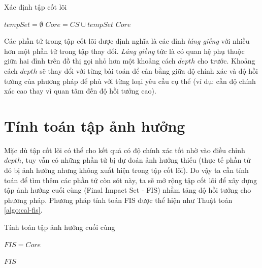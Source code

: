 \documentclass[12pt]{report}
\newenvironment{thuattoan}[1][h]
  {\renewcommand{\algorithmcfname}{Thuật toán}
   \begin{algorithm}[#1]
  }{\end{algorithm}}
\begin{document}
\begin{thuattoan}
\label{algo:cal-core-set}
\caption{Xác định tập cốt lõi}

 $tempSet = \emptyset$\;
 $Core = CS \cup tempSet$\;
 \Return $Core$\;
\end{thuattoan}

Các phần tử trong tập cốt lõi được định nghĩa là các đỉnh \textit{láng giềng} với nhiều hơn một phần tử trong tập thay đổi. \textit{Láng giềng} tức là có quan hệ phụ thuộc giữa hai đỉnh trên đồ thị gọi nhỏ hơn một khoảng cách $depth$ cho trước. Khoảng cách $depth$ sẽ thay đổi với từng bài toán để cân bằng giữa độ chính xác và độ hồi tưởng của phương pháp để phù với từng loại yêu cầu cụ thể (ví dụ: cần độ chính xác cao thay vì quan tâm đến độ hồi tưởng cao).

\section{Tính toán tập ảnh hưởng}
Mặc dù tập cốt lõi có thể cho kết quả có độ chính xác tốt nhờ vào điều chỉnh $depth$, tuy vẫn có những phần tử bị dự đoán ảnh hưởng thiếu (thực tế phần tử đó bị ảnh hưởng nhưng không xuất hiện trong tập cốt lõi). Do vậy ta cần tính toán để tìm thêm các phần tử còn sót này, ta sẽ mở rộng tập cốt lõi để xây dựng tập ảnh hưởng cuối cùng (Final Impact Set - FIS) nhằm tăng độ hồi tưởng cho phương pháp. Phương pháp tính toán FIS được thể hiện như Thuật toán \ref{algo:cal-fis}.

\begin{thuattoan}
\label{algo:cal-fis}
\caption{Tính toán tập ảnh hưởng cuối cùng}


 $FIS = Core$\;
  {
 }

 \Return $FIS$\;
\end{thuattoan}
\end{document}
